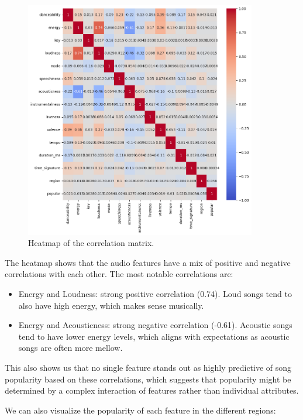 \begin{figure}[h]
    \centering
    \includegraphics[width=0.9\textwidth]{media/heatmap_cleaned.png} 
    \caption{Heatmap of the correlation matrix.}
    \label{correlation}
\end{figure}

The heatmap shows that the audio features have a mix of positive and negative correlations with each other. The most notable correlations are:
\begin{itemize}
    \item 
    Energy and Loudness: strong positive correlation (0.74). Loud songs tend to also have high energy, which makes sense musically.
    \item Energy and Acousticness: strong negative correlation  (-0.61). Acoustic songs tend to have lower energy levels, which aligns with expectations as acoustic songs are often more mellow.
\end{itemize}


This also shows us that no single feature stands out as highly predictive of song popularity based on these correlations, which suggests that popularity might be determined by a complex interaction of features rather than individual attributes. 



\newpage

We can also visualize the popularity of each feature in the different regions:

